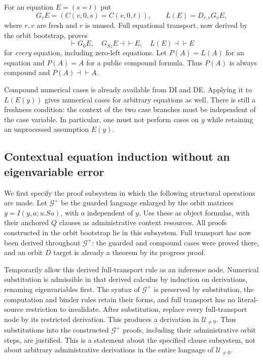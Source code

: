 \documentclass[11pt,letterpaper]{article}
\theoremstyle{definition}\newtheorem{definition}[theorem]{Definition}
\theoremstyle{remark}\newtheorem{remark}[theorem]{Remark}
\newcommand{\UR}{\mathcal U_{\ne0}}
\newcommand{\equider}{\mathrel{\dashv\vdash}}
\begin{document}
For an equation $E=(s=t)$ put
\[
 G_vE=(C(v,0,s)=C(v,0,t)),\qquad L(E)=D_{r,v}G_vE,
\]
where $r,v$ are fresh and $r$ is unused. Full equational transport, now
derived by the orbit bootstrap, proves
\[
 \vdash G_0E,\quad G_{Sz}E\equider E,\quad L(E)\equider E
                                                               \tag{P}
\]
for \emph{every} equation, including zero-left equations. Let
$P(A)=L(A)$ for an equation and $P(A)=A$ for a public compound formula.
Thus $P(A)$ is always compound and $P(A)\equider A$.

Compound numerical cases is already available from DI and DE. Applying it
to $L(E(y))$ gives numerical cases for arbitrary equations as well.
There is still a freshness condition: the context of the two case branches
must be independent of the case variable. In particular, one must not
perform cases on $y$ while retaining an unprocessed assumption $E(y)$.

\subsection{Contextual equation induction without an eigenvariable error}

We first specify the proof subsystem in which the following structural
operations are made. Let $\mathcal G^+$ be the guarded language enlarged
by the orbit matrices $y=I(y,a;u.Su)$, with $a$ independent of $y$.
Use these as object formulas, with their anchored $Q$ clauses as
administrative context resources. All proofs constructed in the orbit
bootstrap lie in this subsystem. Full transport has now been derived
throughout $\mathcal G^+$: the guarded and compound cases were proved
there, and an orbit $D$ target is already a theorem by its progress proof.

Temporarily allow this derived full-transport rule as an inference node.
Numerical substitution is admissible in that derived calculus by induction
on derivations, renaming eigenvariables first. The syntax of
$\mathcal G^+$ is preserved by substitution, the computation and binder
rules retain their forms, and full transport has no literal-source
restriction to invalidate. After substitution, replace every full-transport
node by its restricted derivation. This produces a derivation in $\UR$.
Thus substitutions into the constructed $\mathcal G^+$ proofs, including
their administrative orbit steps, are justified. This is a statement about
the specified clause subsystem, not about arbitrary administrative
derivations in the entire language of $\UR$.
\end{document}
